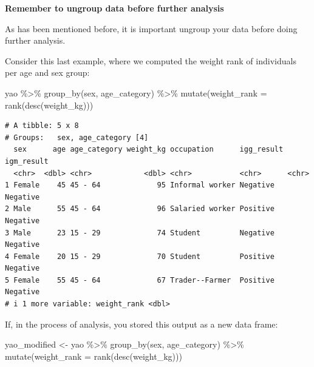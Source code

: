 \documentclass[
  letterpaper,
  DIV=11,
  numbers=noendperiod]{scrreprt}
\newenvironment{Shaded}{\begin{snugshade}}{\end{snugshade}}
\newcommand{\AttributeTok}[1]{\textcolor[rgb]{0.40,0.45,0.13}{#1}}
\newcommand{\FunctionTok}[1]{\textcolor[rgb]{0.28,0.35,0.67}{#1}}
\newcommand{\NormalTok}[1]{\textcolor[rgb]{0.00,0.23,0.31}{#1}}
\newcommand{\OtherTok}[1]{\textcolor[rgb]{0.00,0.23,0.31}{#1}}
\newcommand{\SpecialCharTok}[1]{\textcolor[rgb]{0.37,0.37,0.37}{#1}}
\begin{document}
\begin{tcolorbox}[enhanced jigsaw, title=\textcolor{quarto-callout-caution-color}{\faFire}\hspace{0.5em}{Watch Out}, colbacktitle=quarto-callout-caution-color!10!white, leftrule=.75mm, arc=.35mm, opacityback=0, bottomrule=.15mm, rightrule=.15mm, toptitle=1mm, breakable, toprule=.15mm, colback=white, coltitle=black, colframe=quarto-callout-caution-color-frame, bottomtitle=1mm, titlerule=0mm, left=2mm, opacitybacktitle=0.6]

\textbf{Remember to ungroup data before further analysis}

As has been mentioned before, it is important ungroup your data before
doing further analysis.

Consider this last example, where we computed the weight rank of
individuals per age and sex group:

\begin{Shaded}
\begin{Highlighting}[]
\NormalTok{yao }\SpecialCharTok{\%\textgreater{}\%} 
  \FunctionTok{group\_by}\NormalTok{(sex, age\_category) }\SpecialCharTok{\%\textgreater{}\%} 
  \FunctionTok{mutate}\NormalTok{(}\AttributeTok{weight\_rank =} \FunctionTok{rank}\NormalTok{(}\FunctionTok{desc}\NormalTok{(weight\_kg)))}
\end{Highlighting}
\end{Shaded}

\begin{verbatim}
# A tibble: 5 x 8
# Groups:   sex, age_category [4]
  sex      age age_category weight_kg occupation      igg_result igm_result
  <chr>  <dbl> <chr>            <dbl> <chr>           <chr>      <chr>     
1 Female    45 45 - 64             95 Informal worker Negative   Negative  
2 Male      55 45 - 64             96 Salaried worker Positive   Negative  
3 Male      23 15 - 29             74 Student         Negative   Negative  
4 Female    20 15 - 29             70 Student         Positive   Negative  
5 Female    55 45 - 64             67 Trader--Farmer  Positive   Negative  
# i 1 more variable: weight_rank <dbl>
\end{verbatim}

If, in the process of analysis, you stored this output as a new data
frame:

\begin{Shaded}
\begin{Highlighting}[]
\NormalTok{yao\_modified }\OtherTok{\textless{}{-}} 
\NormalTok{  yao }\SpecialCharTok{\%\textgreater{}\%} 
  \FunctionTok{group\_by}\NormalTok{(sex, age\_category) }\SpecialCharTok{\%\textgreater{}\%} 
  \FunctionTok{mutate}\NormalTok{(}\AttributeTok{weight\_rank =} \FunctionTok{rank}\NormalTok{(}\FunctionTok{desc}\NormalTok{(weight\_kg)))}
\end{Highlighting}
\end{Shaded}


\end{tcolorbox}
\end{document}
